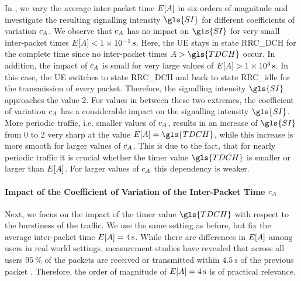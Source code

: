 In , we vary the average inter-packet time \(E[A]\) in six orders of magnitude and investigate the resulting signalling intensity \(\gls{SI}\) for different coefficients of variation \(c_{A}\).
We observe that \(c_{A}\) has no impact on \(\gls{SI}\) for very small inter-packet times \(E[A]<\SI{1e-1}{\second}\).
Here, the \gls{UE} stays in state \gls{RRC_DCH} for the complete time since no inter-packet times \(\PacketIAT>\gls{TDCH}\) occur.
In addition, the impact of \(c_{A}\) is small for very large values of \(E[A]>\SI{1e3}{\second}\).
In this case, the \gls{UE} switches to state \gls{RRC_DCH} and back to state \gls{RRC_idle} for the transmission of every packet. Therefore, the signalling intensity \(\gls{SI}\) approaches the value 2.
For values in between these two extremes, the coefficient of variation \(c_{A}\) has a considerable impact on the signalling intensity \(\gls{SI}\).
More periodic traffic, i.e. smaller values of \(c_{A}\), results in an increase of \(\gls{SI}\)from 0 to 2 very sharp at the value \(E[\PacketIAT]=\gls{TDCH}\), while this increase is more smooth for larger values of \(c_{A}\).
This is due to the fact, that for nearly periodic traffic it is crucial whether the timer value \(\gls{TDCH}\) is smaller or larger than \(E[A]\). 
For larger values of \(c_{A}\) this dependency is weaker.

\paragraph*{Impact of the Coefficient of Variation of the Inter-Packet Time \(c_A\)}

Next, we focus on the impact of the timer value \(\gls{TDCH}\) with respect to the burstiness of the traffic.
We use the same setting as before, but fix the average inter-packet time \(E[A]=\SI{4}{\second}\).
While there are differences in \(E[A]\) among users in real world settings, measurement studies have revealed that across all users \(\SI{95}{\percent}\) of the packets are received or transmitted within \(\SI{4.5}{\second}\) of the previous packet \cite{Falaki2010a}.
Therefore, the order of magnitude of \(E[A]=\SI{4}{\second}\) is of practical relevance. 

